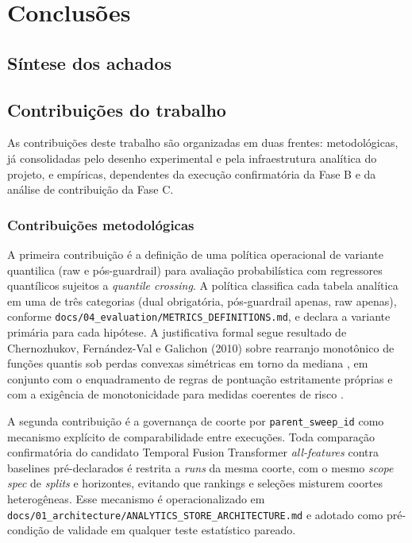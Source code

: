 \chapter{Conclusões}


\section{Síntese dos achados}

\section{Contribuições do trabalho}
As contribuições deste trabalho são organizadas em duas frentes: metodológicas, já consolidadas pelo desenho experimental e pela infraestrutura analítica do projeto, e empíricas, dependentes da execução confirmatória da Fase B e da análise de contribuição da Fase C.

\subsection{Contribuições metodológicas}
A primeira contribuição é a definição de uma política operacional de variante quantilica (raw e pós-guardrail) para avaliação probabilística com regressores quantílicos sujeitos a \textit{quantile crossing}. A política classifica cada tabela analítica em uma de três categorias (dual obrigatória, pós-guardrail apenas, raw apenas), conforme \texttt{docs/04\_evaluation/METRICS\_DEFINITIONS.md}, e declara a variante primária para cada hipótese. A justificativa formal segue resultado de Chernozhukov, Fernández-Val e Galichon (2010) sobre rearranjo monotônico de funções quantis sob perdas convexas simétricas em torno da mediana \cite{CHERNOZHUKOV2010REARRANGEMENT}, em conjunto com o enquadramento de regras de pontuação estritamente próprias \cite{GNEITING2007} e com a exigência de monotonicidade para medidas coerentes de risco \cite{JORION2007,ACERBI2002}.

A segunda contribuição é a governança de coorte por \texttt{parent\_sweep\_id} como mecanismo explícito de comparabilidade entre execuções. Toda comparação confirmatória do candidato Temporal Fusion Transformer \textit{all-features} contra baselines pré-declarados é restrita a \textit{runs} da mesma coorte, com o mesmo \textit{scope spec} de \textit{splits} e horizontes, evitando que rankings e seleções misturem coortes heterogêneas. Esse mecanismo é operacionalizado em \texttt{docs/01\_architecture/ANALYTICS\_STORE\_ARCHITECTURE.md} e adotado como pré-condição de validade em qualquer teste estatístico pareado.

